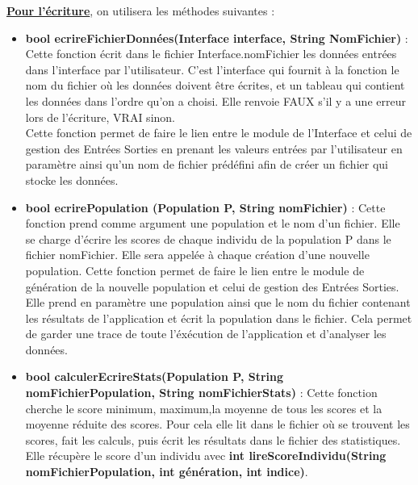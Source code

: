 \documentclass[a4paper,11pt]{article}
\begin{document}
			\underline{\bf Pour l'écriture}, on utilisera les méthodes suivantes :\\
			\begin{itemize}
				\item \textbf{bool ecrireFichierDonnées(Interface interface, String NomFichier)} : Cette fonction écrit dans le fichier Interface.nomFichier les données entrées dans l’interface par l’utilisateur. 
					C’est l’interface qui fournit à la fonction le nom du fichier où les données doivent être écrites, et un tableau qui contient les données dans l’ordre qu’on a choisi. 
					Elle renvoie FAUX s’il y a une erreur lors de l’écriture, VRAI sinon.\\
					Cette fonction permet de faire le lien entre le module de l’Interface et celui de gestion des Entrées Sorties en prenant les valeurs entrées par l’utilisateur en paramètre ainsi qu’un nom de fichier prédéfini afin de créer un fichier qui stocke les données.\vspace{0.2cm}
				\item \textbf{bool ecrirePopulation (Population P, String nomFichier)} : Cette fonction prend comme argument une population et le nom d’un fichier. 
					Elle se charge d’écrire les scores de chaque individu de la population P dans le fichier nomFichier. 
					Elle sera appelée à chaque création d’une nouvelle population. %
					Cette fonction permet de faire le lien entre le module de génération de la nouvelle population et celui de gestion des Entrées Sorties. 
					Elle prend en paramètre une population ainsi que le nom du fichier contenant les résultats de l’application et écrit la population dans le fichier. 
					Cela permet de garder une trace de toute l’éxécution de l’application et d’analyser les données.\vspace{0.2cm}
				\item \textbf{bool calculerEcrireStats(Population P, String nomFichierPopulation, String nomFichierStats)} : Cette fonction cherche le score minimum, maximum,la moyenne de tous les scores et la moyenne réduite des scores. 
					Pour cela elle lit dans le fichier où se trouvent les scores, fait les calculs, puis écrit les résultats dans le fichier des statistiques. 
					Elle récupère le score d’un individu avec \textbf{int lireScoreIndividu(String nomFichierPopulation, int génération, int indice)}. %

\end{itemize}
\end{document}
